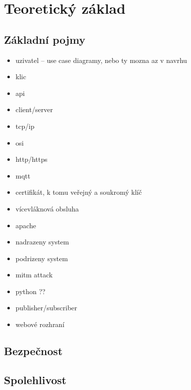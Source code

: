 \chapter{Teoretický základ}
\label{sec:te}

\section{Základní pojmy}

\begin{itemize}
    \item uzivatel -- use case diagramy, nebo ty mozna az v navrhu
    \item klic
    \item api
    \item client/server
    \item tcp/ip
    \item osi
    \item http/https
    \item mqtt
    \item certifikát, k tomu veřejný a soukromý klíč
    \item vícevláknová obsluha
    \item apache
    \item nadrazeny system
    \item podrizeny system
    \item mitm attack
    \item python ??
    \item publisher/subscriber
    \item webové rozhraní
\end{itemize}

\section{Bezpečnost}

\section{Spolehlivost}